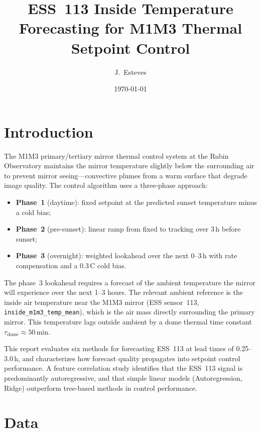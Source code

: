 \documentclass[11pt]{article}
\title{ESS~113 Inside Temperature Forecasting for M1M3 Thermal Setpoint Control}
\author{J.\ Esteves}
\date{\today}
\begin{document}
\maketitle

\section{Introduction}
\label{sec:intro}

The M1M3 primary/tertiary mirror thermal control system at the Rubin Observatory
maintains the mirror temperature slightly below the surrounding air to prevent
mirror seeing---convective plumes from a warm surface that degrade image quality.
The control algorithm uses a three-phase approach:
\begin{itemize}
  \item \textbf{Phase~1} (daytime): fixed setpoint at the predicted sunset temperature minus a cold bias;
  \item \textbf{Phase~2} (pre-sunset): linear ramp from fixed to tracking over 3\,h before sunset;
  \item \textbf{Phase~3} (overnight): weighted lookahead over the next 0--3\,h with rate compensation and a 0.3\,\textdegree C cold bias.
\end{itemize}

The phase~3 lookahead requires a forecast of the ambient temperature the mirror
will experience over the next 1--3 hours.  The relevant ambient reference is the
inside air temperature near the M1M3 mirror (ESS sensor~113,
\texttt{inside\_m1m3\_temp\_mean}), which is the air mass directly surrounding
the primary mirror.
This temperature lags outside ambient by a dome thermal time constant
$\tau_\mathrm{dome} \approx 50$\,min.

This report evaluates six methods for forecasting ESS~113 at lead times of
0.25--3.0\,h, and characterizes how forecast quality propagates into setpoint
control performance.  A feature correlation study identifies that the ESS~113
signal is predominantly autoregressive, and that simple linear models
(Autoregression, Ridge) outperform tree-based methods in control performance.

\section{Data}
\label{sec:data}
\end{document}

